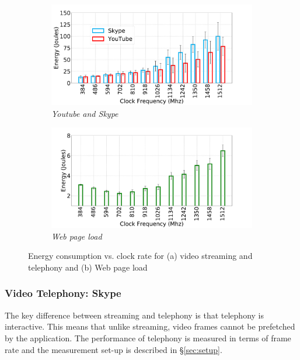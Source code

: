 \begin{figure}
    \begin{subfigure}[b]{0.5\textwidth}
        \centering
        \includegraphics[width=1\linewidth]{sections/device-work/power-video}
    	 \caption{\textit{Youtube and Skype}}
    \end{subfigure}
    \begin{subfigure}[b]{0.5\textwidth}
        \centering
        \includegraphics[width=1\linewidth]{sections/device-work/power-plt}
   	\caption{\textit{Web page load}}
    \end{subfigure}
  \caption{Energy consumption vs. clock rate for (a) video streaming and telephony and (b) Web page load}
  \label{fig:power-video-web}
  \vspace{-0.15in}
\end{figure}



\subsubsection{Video Telephony: Skype}

The key difference between streaming and telephony is that telephony is interactive. This means that unlike streaming,  video frames cannot be prefetched by the application. The performance of telephony is measured in terms of frame rate %
and the measurement set-up is described in \S\ref{sec:setup}.


